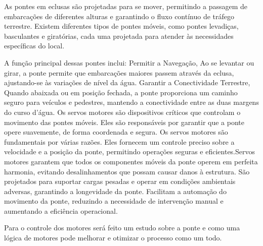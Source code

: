 As pontes em eclusas são projetadas para se mover, permitindo a passagem de embarcações de diferentes alturas e garantindo o fluxo contínuo de tráfego terrestre. Existem diferentes tipos de pontes móveis, como pontes levadiças, basculantes e giratórias, cada uma projetada para atender às necessidades específicas do local.

A função principal dessas pontes inclui: Permitir a Navegação, Ao se levantar ou girar, a ponte permite que embarcações maiores passem através da eclusa, ajustando-se às variações de nível da água.
Garantir a Conectividade Terrestre, Quando abaixada ou em posição fechada, a ponte proporciona um caminho seguro para veículos e pedestres, mantendo a conectividade entre as duas margens do curso d'água.
Os servos motores são dispositivos críticos que controlam o movimento das pontes móveis. Eles são responsáveis por garantir que a ponte opere suavemente, de forma coordenada e segura. Os servos motores são fundamentais por várias razões. Eles fornecem um controle preciso sobre a velocidade e a posição da ponte, permitindo operações seguras e eficientes.Servos motores garantem que todos os componentes móveis da ponte operem em perfeita harmonia, evitando desalinhamentos que possam causar danos à estrutura. São projetados para suportar cargas pesadas e operar em condições ambientais adversas, garantindo a longevidade da ponte. Facilitam a automação do movimento da ponte, reduzindo a necessidade de intervenção manual e aumentando a eficiência operacional.

Para o controle dos motores será feito um estudo sobre a ponte e como uma lógica de motores pode melhorar e otimizar o processo como um todo.